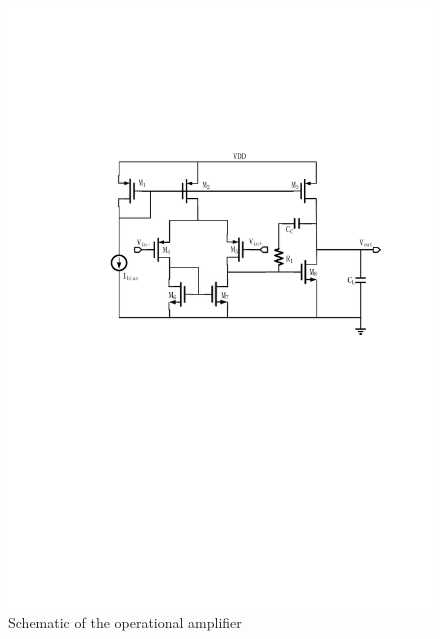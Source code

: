 \begin{figure}[h]
    \begin{center}
        \centerline{\includegraphics[width=\columnwidth]{./img/sopam.pdf}}
        \caption{Schematic of the operational amplifier}
        \label{fig:schDAC2014}
    \end{center}
\end{figure}

